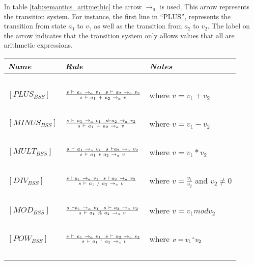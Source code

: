 In table \ref{tab:semantics_aritmethic} the arrow $\rightarrow_{a}$ is used. This arrow represents the transition system. For instance, the first line in ``PLUS'', represents the transition from state $a_1$ to $v_1$ as well as the transition from $a_2$ to $v_2$. The label on the arrow indicates that the transition system only allows values that all are arithmetic expressions.

\begin{table}[H]
	\begin{tabular}{|l|l|l|}
	\hline
	\emph{Name}			& \emph{Rule}																															& \emph{Notes} \\ \hline
			~			&															~																			& ~ \\
	$[PLUS_{BSS}]$		& $s~\vdash~a_{1}~\rightarrow_{a}~v_{1}~~ s~\vdash~a_{2}~\rightarrow_{a}~v_{2} \over s~\vdash~a_{1}~+~a_{2}~\rightarrow_{a}~v$ 			& where $v = v_{1}+v_{2}$ \\
			~			&															~																			& ~ \\
	$[MINUS_{BSS}]$		& $s~\vdash~a_{1}~\rightarrow_{a}~v_{1}~~s \vdash a_{2}~\rightarrow_{a}~v_{2} \over s~\vdash~a_{1}~-~a_{2}~\rightarrow_{a}~v$ 			& where $v = v_{1}-v_{2}$ \\
			~			&															~																			& ~ \\
	$[MULT_{BSS}]$		& $s~\vdash~a_{1}~\rightarrow_{a}~v_{1}~~s~\vdash a_{2}~\rightarrow_{a}~v_{2} \over s~\vdash~a_{1}~*~a_{2}~\rightarrow_{a}~v$ 			& where $v = v_{1}*v_{2}$ \\
			~			&															~																			& ~ \\
	$[DIV_{BSS}]$		& $s~\vdash a_{1}~\rightarrow_{a}~v_{1}~~s ~\vdash a_{2}~\rightarrow_{a}~v_{2} \over s~\vdash~{a_{1}}~/~{a_{2}}~\rightarrow_{a}~v$ 		& where $v = \frac{v_{1}}{v_{2}}$ and $v_2 \neq 0$\\
			~			&																																		& ~ \\
	$[MOD_{BSS}]$		& $s~\vdash a_{1}~\rightarrow_{a}~v_{1}~~s~\vdash~a_{2}~\rightarrow_{a}~v_{2} \over s~\vdash~a_{1}~\%~a_{2}~\rightarrow_{a}~v$			& where $v = v_{1} mod v_{2}$ \\
			~			&															~																			& ~ \\
	$[POW_{BSS}]$		& $s~\vdash~a_{1}~\rightarrow_{a}~v_{1}~~s~\vdash~a_{2}~
	\rightarrow_{a}~v_{2} \over~s~\vdash~a_{1}~\texttt{\^{}}~a_{2}~\rightarrow_{a}~v$	& where $v = v_{1}\texttt{\^{}}v_{2}$ \\
			~			&															~																			& ~ \\

\end{tabular}
\end{table}

